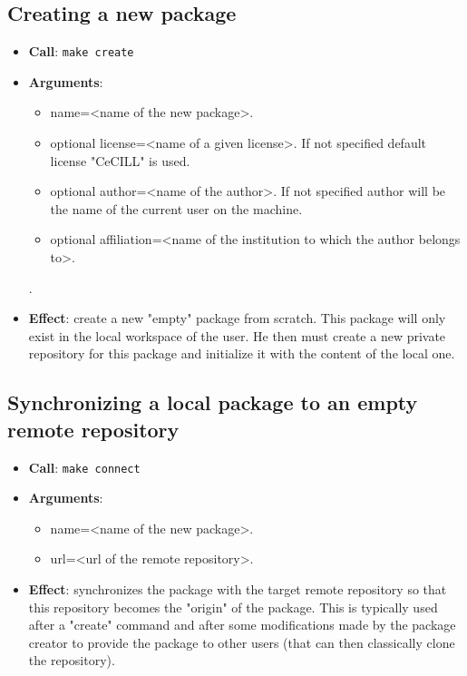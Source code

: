 \documentclass[12pt,a4paper]{article}
\begin{document}
\subsection{Creating a new package}
\begin{itemize}
\item \textbf{Call}: \texttt{make create}
\item \textbf{Arguments}:
\begin{itemize}
\item name=<name of the new package>.
\item {optional} license=<name of a given license>. If not specified default license "CeCILL" is used.
\item {optional} author=<name of the author>. If not specified author will be the name of the current user on the machine.
\item {optional} affiliation=<name of the institution to which the author belongs to>.
\end{itemize}. 
\item \textbf{Effect}: create a new "empty" package from scratch. This package will only exist in the local workspace of the user. He then must create a new private repository for this package and initialize it with the content of the local one.
\end{itemize}

\subsection{Synchronizing a local package to an empty remote repository}
\begin{itemize}
\item \textbf{Call}: \texttt{make connect}
\item \textbf{Arguments}:
\begin{itemize}
\item name=<name of the new package>.
\item url=<url of the remote repository>.
\end{itemize}
\item \textbf{Effect}: synchronizes the package with the target remote repository so that this repository becomes the "origin" of the package. This is typically used after a "create" command and after some modifications made by the package creator to provide the package to other users (that can then classically clone the repository).
\end{itemize}
\end{document}
